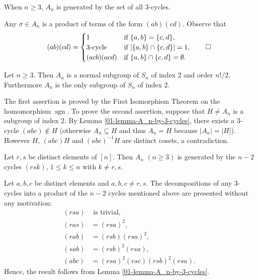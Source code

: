 \begin{lemma} \label{01-lemma-A_n-by-3-cycles}
	When $n\geq 3$, $A_n$ is generated by the set of all $3$-cycles.
\end{lemma}
\begin{sketch}
	Any $\sigma\in A_n$ is a product of terms of the form $(ab)(cd)$. Observe that
	\begin{equation*}
		(ab)(cd) = \begin{cases}
			1 &\text{if }\{a,b\} = \{c,d\}, \\
			3\text{-cycle} &\text{if }|\{a,b\} \cap \{c,d\}|=1,
			\\
			(acb)(acd) & \text{if }\{a,b\} \cap \{c,d\} = \emptyset. 
		\end{cases}\qedhere
	\end{equation*}
\end{sketch}
\begin{theorem}
	Let $n\geq 3$. Then $A_n$ is a normal subgroup of $S_n$ of index $2$ and order $n!/2$. Furthermore $A_n$ is the only subgroup of $S_n$ of index $2$.
\end{theorem}
\begin{sketch}
	The first assertion is proved by the First Isomorphism Theorem on the homomorphism $\operatorname{sgn}$. To prove the second assertion, suppose that $H\neq A_n$ is a subgroup of index $2$. By Lemma \ref{01-lemma-A_n-by-3-cycles}, there exists a $3$-cycle $(abc)\not\in H$ (otherwise $A_n\subseteq H$ and thus $A_n = H$ because $|A_n|= |H|$). However $H$, $(abc)H$ and $(abc)^{-1}H$ are distinct cosets, a contradiction.
\end{sketch}
\begin{lemma} \label{lemma-A_n-gen-by-n-2-cycles}
	Let $r,s$ be distinct elements of $[n]$. Then $A_n$  $(n \geq 3)$ is generated by the $n-2$ cycles $(rsk)$, $1\leq k\leq n$ with $k\neq r,s$.
\end{lemma}
\begin{sketch}
	Let $a,b,c$ be distinct elements and $a,b,c\neq r,s$. The decompositions of any $3$-cycles into a product of the $n-2$ cycles mentioned above are presented without any motivation:
	\begin{align*}
		(rsa)& \text{ is trivial},
		\\
		(ras) &= (rsa)^2,
		\\
		(rab) &= (rsb)(rsa)^2,
		\\
		(sab) &= (rsb)^2(rsa),
		\\
		(abc) &= (rsa)^2(rsc)(rsb)^2(rsa).
	\end{align*}
	Hence, the result follows from Lemma \ref{01-lemma-A_n-by-3-cycles}.
\end{sketch}
